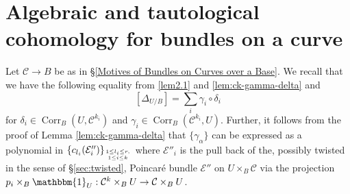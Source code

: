 \documentclass[11pt]{amsart}
\theoremstyle{definition}
\newcommand{\J}{\mathscr{J}}
\newcommand{\jac}{\mathcal{J}}
\newcommand{\m}{\mathcal{M}}
\newcommand{\h}{\mathcal{H}}
\newcommand{\U}{\mathscr{U}}
\newcommand{\ve}{\mathcal{V}ec}
\newcommand{\hr}{\hookrightarrow}
\begin{document}
\section{Algebraic and tautological cohomology for bundles on a curve}

Let $\mathcal C \rightarrow B$ be as in \S\ref{Motives of Bundles on Curves over a Base}. We recall that we have the following equality from \ref{lem2.1} and \ref{lem:ck-gamma-delta} and \begin{equation}\label{diagonal as sum of composition}
    [\Delta_{U/B}] = \sum_i \gamma_i \circ \delta_i
\end{equation} 
for $\delta_i \in\operatorname{Corr}_B(U, \mathcal C^{k_i})$  and $\gamma_i \in \operatorname{Corr}_B (\mathcal C^{k_i} , U) $. 
Further, it follows from the proof of Lemma \ref{lem:ck-gamma-delta} that $\{\gamma_\alpha\}$ can be expressed as a polynomial in
 $\left \{c_{l_i}(\mathcal E''_i)\right \}_ {1\leq l_i\leq r,\atop 1\leq i\leq k}$ 
 where $\mathcal E''_i$ is the pull back of the, possibly twisted in the sense of \S\ref{sec:twisted}, 
 Poincar\'e bundle $\mathcal E''$ on $U \times_B \mathcal C$ via the projection $p_i \times_B \mathbbm{1}_{U} : \mathcal C^k \times_B U \rightarrow \mathcal C\times_B U$. 
\end{document}
